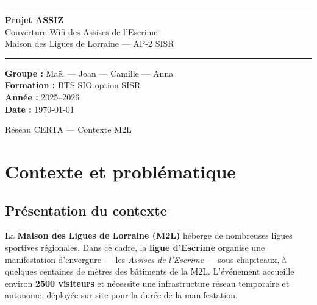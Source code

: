 \documentclass[a4paper,12pt]{article}
\begin{document}
\thispagestyle{empty}

\begin{center}
  \vspace*{2cm}
  {\color{primary}\rule{\textwidth}{2pt}}
  \vspace{0.8em}

  {\Huge\bfseries\sffamily\color{primary} Projet ASSIZ}\\[0.4em]
  {\Large\sffamily\color{darkgray} Couverture Wifi des Assises de l'Escrime}\\[0.2em]
  {\normalsize\color{darkgray} Maison des Ligues de Lorraine — AP-2 SISR}

  \vspace{0.8em}
  {\color{primary}\rule{\textwidth}{2pt}}

  \vspace{2cm}

  \begin{tcolorbox}[colback=lightgray, colframe=primary!30, sharp corners, width=0.7\textwidth]
    \centering
    \textbf{Groupe :} Maël — Joan — Camille — Anna\\[0.3em]
    \textbf{Formation :} BTS SIO option SISR\\[0.3em]
    \textbf{Année :} 2025–2026\\[0.3em]
    \textbf{Date :} \today
  \end{tcolorbox}
\end{center}

\vfill
{\small\color{darkgray}\centering Réseau CERTA — Contexte M2L\par}

\newpage
\tableofcontents
\newpage

\section{Contexte et problématique}

\subsection{Présentation du contexte}

La \textbf{Maison des Ligues de Lorraine (M2L)} héberge de nombreuses ligues sportives régionales.
Dans ce cadre, la \textbf{ligue d'Escrime} organise une manifestation d'envergure ---
les \textit{Assises de l'Escrime} --- sous chapiteaux, à quelques centaines de mètres des bâtiments de la M2L.
L'événement accueille environ \textbf{2500 visiteurs} et nécessite une infrastructure réseau temporaire
et autonome, déployée sur site pour la durée de la manifestation.
\end{document}
